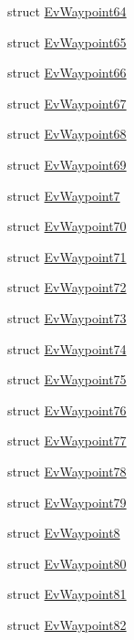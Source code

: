 \begin{DoxyCompactItemize}
struct \hyperlink{structmove__base__z__client_1_1EvWaypoint64}{Ev\+Waypoint64}
\item 
struct \hyperlink{structmove__base__z__client_1_1EvWaypoint65}{Ev\+Waypoint65}
\item 
struct \hyperlink{structmove__base__z__client_1_1EvWaypoint66}{Ev\+Waypoint66}
\item 
struct \hyperlink{structmove__base__z__client_1_1EvWaypoint67}{Ev\+Waypoint67}
\item 
struct \hyperlink{structmove__base__z__client_1_1EvWaypoint68}{Ev\+Waypoint68}
\item 
struct \hyperlink{structmove__base__z__client_1_1EvWaypoint69}{Ev\+Waypoint69}
\item 
struct \hyperlink{structmove__base__z__client_1_1EvWaypoint7}{Ev\+Waypoint7}
\item 
struct \hyperlink{structmove__base__z__client_1_1EvWaypoint70}{Ev\+Waypoint70}
\item 
struct \hyperlink{structmove__base__z__client_1_1EvWaypoint71}{Ev\+Waypoint71}
\item 
struct \hyperlink{structmove__base__z__client_1_1EvWaypoint72}{Ev\+Waypoint72}
\item 
struct \hyperlink{structmove__base__z__client_1_1EvWaypoint73}{Ev\+Waypoint73}
\item 
struct \hyperlink{structmove__base__z__client_1_1EvWaypoint74}{Ev\+Waypoint74}
\item 
struct \hyperlink{structmove__base__z__client_1_1EvWaypoint75}{Ev\+Waypoint75}
\item 
struct \hyperlink{structmove__base__z__client_1_1EvWaypoint76}{Ev\+Waypoint76}
\item 
struct \hyperlink{structmove__base__z__client_1_1EvWaypoint77}{Ev\+Waypoint77}
\item 
struct \hyperlink{structmove__base__z__client_1_1EvWaypoint78}{Ev\+Waypoint78}
\item 
struct \hyperlink{structmove__base__z__client_1_1EvWaypoint79}{Ev\+Waypoint79}
\item 
struct \hyperlink{structmove__base__z__client_1_1EvWaypoint8}{Ev\+Waypoint8}
\item 
struct \hyperlink{structmove__base__z__client_1_1EvWaypoint80}{Ev\+Waypoint80}
\item 
struct \hyperlink{structmove__base__z__client_1_1EvWaypoint81}{Ev\+Waypoint81}
\item 
struct \hyperlink{structmove__base__z__client_1_1EvWaypoint82}{Ev\+Waypoint82}
\item 

\end{DoxyCompactItemize}

